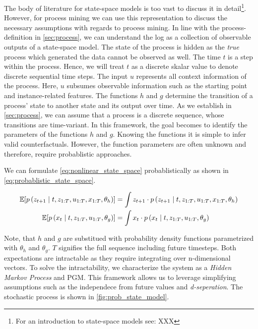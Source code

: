\documentclass[./../../paper.tex]{subfiles}
\begin{document}
The body of literature for state-space models is too vast to discuss it in detail\footnote{For an introduction to state-space models see: XXX}. However, for process mining we can use this representation to discuss the necessary assumptions with regards to process mining.
In line with the process-definition in \autoref{sec:process}, we can understand the \gls{log} as a collection of observable outputs of a state-space model. The state of the process is hidden as the \emph{true} process which generated the data cannot be observed as well. The time $t$ is a step within the process. Hence, we will treat $t$ as a discrete skalar value to denote discrete sequential time steps. The input $u$ represents all context information of the process. Here, $u$ subsumes observable information such as the starting point and \gls{instance}-related features. The functions $h$ and $g$ determine the transition of a process' state to another state and its output over time. As we establish in \autoref{sec:process}, we can assume that a process is a discrete sequence, whose transitions are time-variant. In this framework, the goal becomes to identify the parameters of the functions $h$ and $g$. Knowing the functions it is simple to infer valid counterfactuals. However, the function parameters are often unknown and therefore, require probablistic approaches.

We can formulate \autoref{eq:nonlinear_state_space} probablistically as shown in \autoref{eq:probablistic_state_space}.

\begin{align}
    \label{eq:probablistic_state_space}
    \mathbb{E}[p\left(z_{t+1} \mid t, z_{1:T}, u_{1:T}, x_{1:T}, \theta_h\right)] & =
    \int z_{t+1} \cdot p\left(z_{t+1} \mid t, z_{1:T}, u_{1:T}, x_{1:T}, \theta_h\right) \\
    \mathbb{E}[p\left(x_t \mid t, z_{1:T}, u_{1:T}, \theta_g\right)]   & =
    \int x_{t} \cdot p\left(x_t \mid t, z_{1:T}, u_{1:T}, \theta_g\right) \nonumber
\end{align}

Note, that $h$ and $g$ are substitued with probability density functions parametrized with $\theta_h$ and $\theta_g$. $T$ signifies the full sequence including future timesteps.
Both expectations are intractable as they require integrating over n-dimensional vectors. To solve the intractability, we characterize the system as a \emph{Hidden Markov Process} and \gls{PGM}. This framework allows us to leverage simplifying assumptions such as the independece from future values and \emph{d-seperation}. The stochastic process is shown in \autoref{fig:prob_state_model}.
\end{document}
